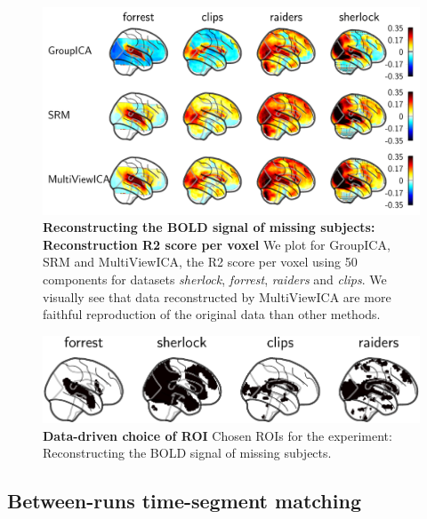 \begin{figure}
  \centering
  \includegraphics[width=\textwidth]{figures/mvica/reconstruction_score_fullbrain.pdf}
  \caption{\textbf{Reconstructing the BOLD signal of missing subjects: Reconstruction R2 score per voxel} We plot for GroupICA, SRM and MultiViewICA, the R2 score per voxel using 50 components for datasets \emph{sherlock}, \emph{forrest}, \emph{raiders} and \emph{clips}. We visually see that data reconstructed by MultiViewICA are more faithful reproduction of the original data than other methods.}
  \label{fig:brainmaps}
\end{figure}

\begin{figure}
  \centering
  \includegraphics[width=\textwidth]{figures/mvica/reconstruction_score_roi.pdf}
  \caption{\textbf{Data-driven choice of ROI} Chosen ROIs for the experiment: Reconstructing the BOLD signal of missing subjects.}
  \label{fig:roi}
\end{figure}

\subsection{Between-runs time-segment matching}
\label{app_spatialmaps}

